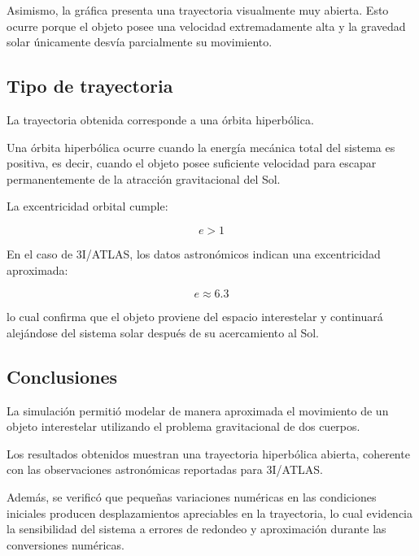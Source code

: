 Asimismo, la gráfica presenta una trayectoria visualmente muy abierta. Esto ocurre porque el objeto posee una velocidad extremadamente alta y la gravedad solar únicamente desvía parcialmente su movimiento.

\subsection{Tipo de trayectoria}

La trayectoria obtenida corresponde a una órbita hiperbólica.

Una órbita hiperbólica ocurre cuando la energía mecánica total del sistema es positiva, es decir, cuando el objeto posee suficiente velocidad para escapar permanentemente de la atracción gravitacional del Sol.

La excentricidad orbital cumple:

\begin{equation}
    e > 1
\end{equation}

En el caso de 3I/ATLAS, los datos astronómicos indican una excentricidad aproximada:

\begin{equation}
    e \approx 6.3
\end{equation}

lo cual confirma que el objeto proviene del espacio interestelar y continuará alejándose del sistema solar después de su acercamiento al Sol.

\subsection{Conclusiones}

La simulación permitió modelar de manera aproximada el movimiento de un objeto interestelar utilizando el problema gravitacional de dos cuerpos.

Los resultados obtenidos muestran una trayectoria hiperbólica abierta, coherente con las observaciones astronómicas reportadas para 3I/ATLAS.

Además, se verificó que pequeñas variaciones numéricas en las condiciones iniciales producen desplazamientos apreciables en la trayectoria, lo cual evidencia la sensibilidad del sistema a errores de redondeo y aproximación durante las conversiones numéricas.
